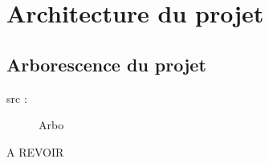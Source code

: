 \chapter{Architecture du projet}

	\section{Arborescence du projet}

		\begin{description}
            \item[src :]{Arbo}
		\end{description}

        A REVOIR
